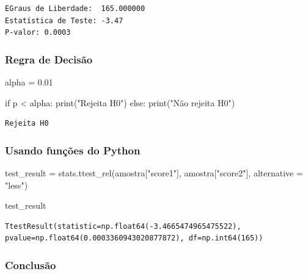 \documentclass[
  letterpaper,
  DIV=11,
  numbers=noendperiod]{scrreprt}
\newenvironment{Shaded}{\begin{snugshade}}{\end{snugshade}}
\newcommand{\BuiltInTok}[1]{\textcolor[rgb]{0.00,0.23,0.31}{#1}}
\newcommand{\ControlFlowTok}[1]{\textcolor[rgb]{0.00,0.23,0.31}{#1}}
\newcommand{\FloatTok}[1]{\textcolor[rgb]{0.68,0.00,0.00}{#1}}
\newcommand{\NormalTok}[1]{\textcolor[rgb]{0.00,0.23,0.31}{#1}}
\newcommand{\OperatorTok}[1]{\textcolor[rgb]{0.37,0.37,0.37}{#1}}
\newcommand{\StringTok}[1]{\textcolor[rgb]{0.13,0.47,0.30}{#1}}
\begin{document}
\begin{verbatim}
EGraus de Liberdade:  165.000000
Estatística de Teste: -3.47
P-valor: 0.0003
\end{verbatim}

\subsubsection{Regra de Decisão}\label{regra-de-decisuxe3o-5}

\begin{Shaded}
\begin{Highlighting}[]
\NormalTok{alpha }\OperatorTok{=} \FloatTok{0.01} 

\ControlFlowTok{if}\NormalTok{ p }\OperatorTok{\textless{}}\NormalTok{ alpha: }
  \BuiltInTok{print}\NormalTok{(}\StringTok{"Rejeita H0"}\NormalTok{) }
\ControlFlowTok{else}\NormalTok{: }
  \BuiltInTok{print}\NormalTok{(}\StringTok{"Não rejeita H0"}\NormalTok{)}
\end{Highlighting}
\end{Shaded}

\begin{verbatim}
Rejeita H0
\end{verbatim}

\subsubsection{Usando funções do
Python}\label{usando-funuxe7uxf5es-do-python}

\begin{Shaded}
\begin{Highlighting}[]
\NormalTok{test\_result }\OperatorTok{=}\NormalTok{ stats.ttest\_rel(amostra[}\StringTok{"score1"}\NormalTok{], amostra[}\StringTok{"score2"}\NormalTok{], alternative }\OperatorTok{=} \StringTok{"less"}\NormalTok{)}

\NormalTok{test\_result}
\end{Highlighting}
\end{Shaded}

\begin{verbatim}
TtestResult(statistic=np.float64(-3.4665474965475522), pvalue=np.float64(0.0003360943020877872), df=np.int64(165))
\end{verbatim}

\subsubsection{Conclusão}\label{conclusuxe3o-3}
\end{document}
